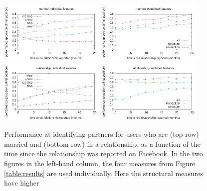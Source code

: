 \documentclass{sigchi}
\begin{document}
\begin{figure}[t]
\begin{center}
 \includegraphics[width=0.45\textwidth]{age03-m7.pdf}
 \label{fig:age-m}
 \includegraphics[width=0.45\textwidth]{perf_by_month_4-04.pdf}
 \label{fig:perf-married}
 \includegraphics[width=0.45\textwidth]{age03-r7.pdf}
 \label{fig:age-r}
 \includegraphics[width=0.45\textwidth]{perf_by_month_2-04.pdf}
 \label{fig:perf-relationship}
\end{center}
\caption{
Performance at identifying partners 
for users who are (top row) married and
(bottom row) in a relationship, 
as a function of the time since the relationship was reported on Facebook.
In the two figures in the left-hand column, 
the four measures from Figure \ref{table:results}
are used individually.
Here the structural measures have higher
}
\end{figure}
\end{document}
